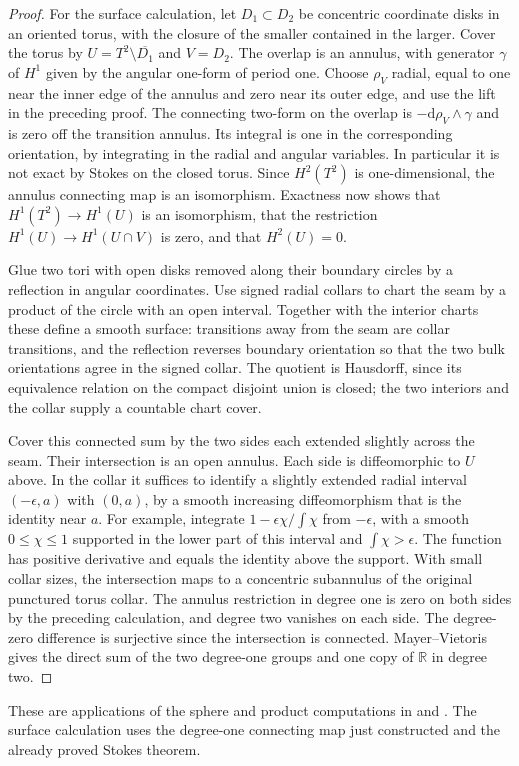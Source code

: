 \documentclass[11pt,oneside,openany]{book}
\theoremstyle{definition}
\theoremstyle{remark}
\newcommand{\R}{\mathbb R}
\newcommand{\dd}{\mathrm d}
\begin{document}
\begin{proof}
For the surface calculation, let \(D_1\subset D_2\) be concentric
coordinate disks in an oriented torus, with the closure of the
smaller contained in the larger. Cover the torus by
\(U=T^2\setminus\overline{D_1}\) and \(V=D_2\).
The overlap is an annulus, with generator \(\gamma\) of \(H^1\)
given by the angular one-form of period one. Choose \(\rho_V\)
radial, equal to one near the inner edge of the annulus and
zero near its outer edge, and use the lift in the preceding
proof. The connecting two-form on the overlap is
\(-\dd\rho_V\wedge\gamma\) and is zero off the transition
annulus. Its integral is one in the corresponding orientation,
by integrating in the radial and angular variables. In
particular it is not exact by Stokes on the closed torus.
Since \(H^2(T^2)\) is one-dimensional, the annulus connecting
map is an isomorphism. Exactness now shows that
\(H^1(T^2)\to H^1(U)\) is an isomorphism, that the restriction
\(H^1(U)\to H^1(U\cap V)\) is zero, and that \(H^2(U)=0\).

Glue two tori with open disks removed along their boundary
circles by a reflection in angular coordinates. Use signed
radial collars to chart the seam by a product of the circle
with an open interval. Together with the interior charts
these define a smooth surface: transitions away from the
seam are collar transitions, and the reflection reverses
boundary orientation so that the two bulk orientations
agree in the signed collar. The quotient is Hausdorff,
since its equivalence relation on the compact disjoint
union is closed; the two interiors and the collar supply
a countable chart cover.

Cover this connected sum by the two sides each extended
slightly across the seam. Their intersection is an open
annulus. Each side is diffeomorphic to \(U\) above.
In the collar it suffices to identify a slightly extended
radial interval \((-\epsilon,a)\) with \((0,a)\), by a
smooth increasing diffeomorphism that is the identity
near \(a\). For example, integrate
\(1-\epsilon\chi/\int\chi\) from \(-\epsilon\), with
a smooth \(0\leq\chi\leq1\) supported in the lower part
of this interval and \(\int\chi>\epsilon\).
The function has positive derivative and equals the
identity above the support. With small collar sizes,
the intersection maps to a concentric subannulus of the
original punctured torus collar. The annulus restriction
in degree one is zero on both sides by the preceding
calculation, and degree two vanishes on each side.
The degree-zero difference is surjective since the
intersection is connected. Mayer--Vietoris gives the
direct sum of the two degree-one groups and one copy of
\(\R\) in degree two.
\end{proof}
These are applications of the sphere and product computations
in \cite[Chapter 17]{lee} and \cite[\S28]{tu}. The surface
calculation uses the degree-one connecting map just constructed
and the already proved Stokes theorem.
\end{document}
